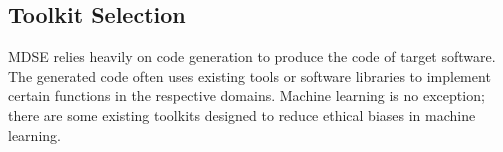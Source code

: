 \documentclass[sigconf,review]{acmart}
\begin{document}
	
	\subsection{Toolkit Selection}
	\label{sec:toolkit_selection}
	MDSE relies heavily on code generation to produce the code of target software. The generated code often uses existing tools or software libraries to implement certain functions in the respective domains. Machine learning is no exception;
	there are some existing toolkits designed to reduce ethical biases in machine learning. 
	
\end{document}
